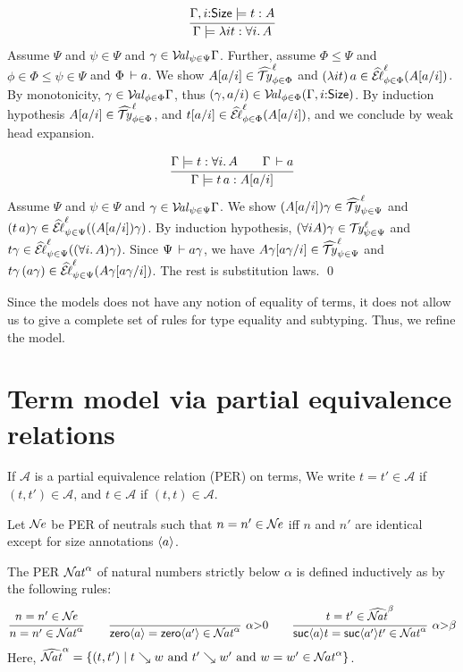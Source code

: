 \documentclass[acmsmall,screen]{acmart}\settopmatter{}
\makeatletter
\newenvironment{proof*}[1][\proofname]{\par
  \normalfont \topsep6\p@\@plus6\p@\relax
  \trivlist
  \item[\@proofindent\hskip\labelsep
        {\@proofnamefont #1\@addpunct{.}}]\ignorespaces
}{%
  \endtrivlist\@endpefalse
}
\renewcommand{\forallT}[2]{\forall #1.\,#2}
\renewcommand{\sext}[3]{(#1,#3/#2)}
\renewcommand{\cext}[3]{#1,#2{:}#3}
\renewcommand{\AA}{\mathcal{A}}
\makeatother
\begin{document}
\noindent
\begin{proof*}
\begin{caselist}
\nextcase
\[
  \ru{\cext \Gamma i \Size \models t : A
    }{\Gamma \models \lambda i t : \forallT i A}
\]
Assume $\Psi$ and $\psi \in \Psi$ and
$\gamma \in \VAL \Psi \psi \Gamma$.  Further, assume $\Phi \leq \Psi$
and $\phi \in \Phi \leq \psi \in \Psi$ and $\Phi \der a$.  We show
$\subst a i A \in \TYhat \Phi \phi \ell$ and
$(\lambda i t)\,a \in \ELhat \Phi \phi \ell {\subst a i A}$.  By
monotonicity, $\gamma \in \VAL \Phi \phi \Gamma$, thus
$\sext \gamma i a \in \VAL \Phi \phi {(\cext \Gamma i \Size)}$.
By induction hypothesis $\subst a i A \in \TYhat \Phi \phi \ell$,
and $\subst a i t \in \ELhat \Phi \phi \ell {\subst a i A}$,
and we conclude by weak head expansion.

\nextcase
\[
  \ru{\Gamma \models t : \forallT i A \qquad
      \Gamma \der a
    }{\Gamma \models t\,a : \subst a i A}
\]
Assume $\Psi$ and $\psi \in \Psi$ and
$\gamma \in \VAL \Psi \psi \Gamma$.  We show
$(\subst a i A)\gamma \in \TYhat \Psi \psi \ell$ and
$(t\,a)\gamma \in \ELhat \Psi \psi \ell {(\subst a i A)\gamma}$.  By
induction hypothesis, $(\forall i A) \gamma \in \TY \Psi \psi \ell$
and $t\gamma \in \ELhat \Psi \psi \ell {(\forallT i A)\gamma}$.  Since
$\Psi \der a \gamma$, we have
$\subst {a\gamma} i {A\gamma} \in \TYhat \Psi \psi \ell$ and
$t \gamma\, (a \gamma) \in \ELhat \Psi \psi \ell {\subst {a\gamma} i
  {A\gamma}}$.
The rest is substitution laws.
\qed
\end{caselist}
\end{proof*}
Since the models does not have any notion of equality of terms, it
does not allow us to give a complete set of rules for type equality
and subtyping.
Thus, we refine the model.


\section{Term model via partial equivalence relations}

If $\AA$ is a partial equivalence relation (PER) on terms, We write $t = t'
\in \AA$ if $(t,t') \in \AA$, and $t \in \AA$ if $(t,t) \in \AA$.

Let $\NE$ be PER of neutrals such that $n = n' \in \NE$ iff $n$ and
$n'$ are identical except for size annotations $\ann a$.

The PER $\NAT^\alpha$ of natural numbers
strictly below $\alpha$ is defined inductively as by the following
rules:
\[
  \ru{n = n' \in \NE
    }{n = n' \in \NAT^\alpha}
\qquad
  \rux{
     }{\zero a = \zero {a'} \in \NAT^{\alpha}
     }{\alpha {>} 0}
\qquad
  \rux{t = t' \in \NAThat^{\beta}
     }{\suc a t = \suc{a'}{t'} \in \NAT^{\alpha}
     }{\alpha {>} \beta}
\]
Here,
$\NAThat^\alpha = \{ (t,t') \mid t \evalsto w \mand t' \evalsto
w' \mand w = w' \in \NAT^\alpha \}$.
\end{document}
